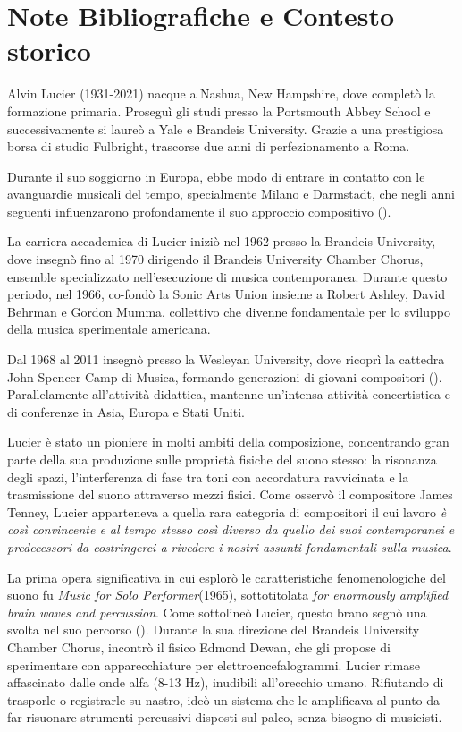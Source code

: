 
\section{Note Bibliografiche e Contesto storico}
Alvin Lucier (1931-2021) nacque a Nashua, New Hampshire, dove completò la formazione primaria. Proseguì gli studi presso la Portsmouth Abbey School e successivamente si laureò a Yale e Brandeis University. Grazie a una prestigiosa borsa di studio Fulbright, trascorse due anni di perfezionamento a Roma.

Durante il suo soggiorno in Europa, ebbe modo di entrare in contatto con le avanguardie musicali del tempo, specialmente Milano e Darmstadt, che negli anni seguenti influenzarono profondamente il suo approccio compositivo (\cite{Lucier1995}).

La carriera accademica di Lucier iniziò nel 1962 presso la Brandeis University, dove insegnò fino al 1970 dirigendo il Brandeis University Chamber Chorus, ensemble specializzato nell'esecuzione di musica contemporanea. Durante questo periodo, nel 1966, co-fondò la Sonic Arts Union insieme a Robert Ashley, David Behrman e Gordon Mumma, collettivo che divenne fondamentale per lo sviluppo della musica sperimentale americana.

Dal 1968 al 2011 insegnò presso la Wesleyan University, dove ricoprì la cattedra John Spencer Camp di Musica, formando generazioni di giovani compositori (\cite{Lucier2012}). Parallelamente all'attività didattica, mantenne un'intensa attività concertistica e di conferenze in Asia, Europa e Stati Uniti.

Lucier è stato un pioniere in molti ambiti della composizione, concentrando gran parte della sua produzione sulle proprietà fisiche del suono stesso: la risonanza degli spazi, l'interferenza di fase tra toni con accordatura ravvicinata e la trasmissione del suono attraverso mezzi fisici. Come osservò il compositore James Tenney, Lucier apparteneva a quella rara categoria di compositori il cui lavoro \textit{è così convincente e al tempo stesso così diverso da quello dei suoi contemporanei e predecessori da costringerci a rivedere i nostri assunti fondamentali sulla musica}.

La prima opera significativa in cui esplorò le caratteristiche fenomenologiche del suono fu \textit{Music for Solo Performer}(1965), sottotitolata \textit{for enormously amplified brain waves and percussion}. Come sottolineò Lucier, questo brano segnò una svolta nel suo percorso (\cite{Lucier1995}). Durante la sua direzione del Brandeis University Chamber Chorus, incontrò il fisico Edmond Dewan, che gli propose di sperimentare con apparecchiature per elettroencefalogrammi. Lucier rimase affascinato dalle onde alfa (8-13 Hz), inudibili all'orecchio umano. Rifiutando di trasporle o registrarle su nastro, ideò un sistema che le amplificava al punto da far risuonare strumenti percussivi disposti sul palco, senza bisogno di musicisti.

